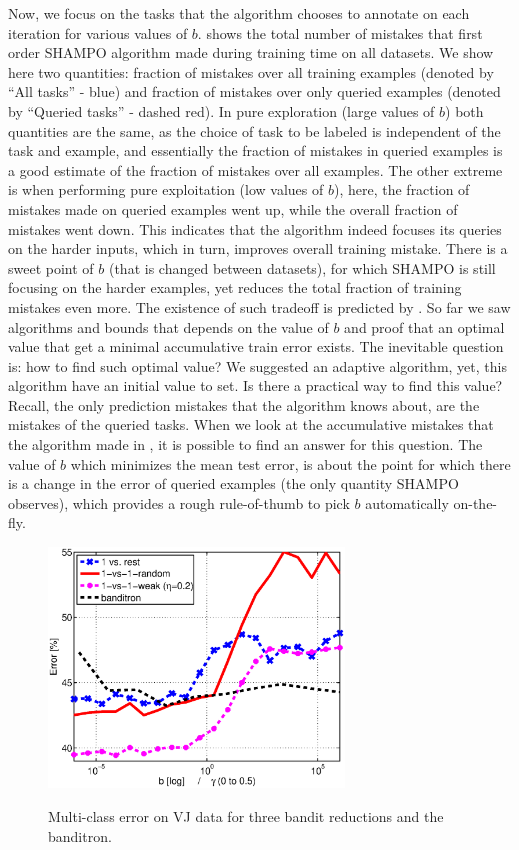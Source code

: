 Now, we focus on the tasks that the algorithm chooses to annotate on each iteration for various values 
of $b$.  shows the total number of mistakes that first order SHAMPO  algorithm 
made during training time on all datasets. 
We show here two quantities: fraction of mistakes over all training examples (denoted by ``All tasks'' - blue) 
and fraction of mistakes over only queried examples (denoted by ``Queried tasks'' - dashed red). 
In pure exploration (large values of $b$) both quantities are the same, as the choice of task to be labeled 
is independent of the task and example, and essentially the fraction of mistakes in queried examples is a 
good estimate of the fraction of mistakes over all examples. 
The other extreme is when performing pure exploitation (low values of
$b$), here, the fraction of mistakes made on queried examples went up, while the overall fraction of mistakes 
went down. This indicates that the algorithm indeed focuses its queries on the harder inputs, which in turn, 
improves overall training mistake. There is a sweet point of $b$ (that is changed between datasets), for 
which SHAMPO is still focusing on the harder examples, yet reduces the total fraction of training mistakes even more. 
The existence of such tradeoff is predicted by .  
So far we saw algorithms and bounds that depends on the value 
of $b$ and proof that an optimal value 
that get a minimal accumulative train error exists. The inevitable question is: how to find such 
optimal value? We suggested an adaptive algorithm, yet, this algorithm have an 
initial value to set. Is there a practical way to find this value? Recall, the only prediction mistakes that the algorithm knows 
about, are the mistakes of the queried tasks. When we look at the accumulative mistakes that the algorithm 
made in  , it is possible to find an answer for this question.
The value of $b$ which minimizes the mean test error, is about the point for which there is a change in the error of 
queried examples (the only quantity SHAMPO observes), which provides a rough rule-of-thumb to pick 
$b$ automatically on-the-fly.

\begin{figure}[!ht]
\begin{centering}
\includegraphics[width=0.7\textwidth]{figs/VJ_three_methods.eps}\label{fig:mc_vj}
\caption{Multi-class error on VJ data for three bandit reductions and the banditron.}
\end{centering}
\end{figure}

